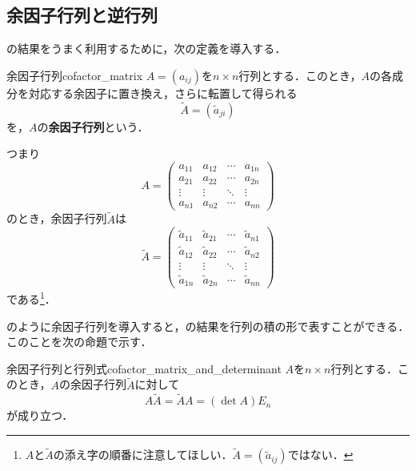 \subsection{余因子行列と逆行列}

の結果をうまく利用するために，次の定義を導入する．

\begin{definition}{余因子行列}{cofactor_matrix}
  $A = (a_{ij})$を$n \times n$行列とする．このとき，$A$の各成分を対応する余因子に置き換え，さらに転置して得られる
  \[
  \tilde{A} = (\tilde{a}_{ji})
  \]
  を，$A$の\textbf{余因子行列}という．

  つまり
  \[
   A = 
   \begin{pmatrix} 
    a_{11} & a_{12} & \cdots & a_{1n} \\
    a_{21} & a_{22} & \cdots & a_{2n} \\
    \vdots & \vdots & \ddots & \vdots \\
    a_{n1} & a_{n2} & \cdots & a_{nn}
   \end{pmatrix}
  \]
  のとき，余因子行列$\tilde{A}$は
  \[
    \tilde{A} =
    \begin{pmatrix}
    \tilde{a}_{11} & \tilde{a}_{21} & \cdots & \tilde{a}_{n1} \\
    \tilde{a}_{12} & \tilde{a}_{22} & \cdots & \tilde{a}_{n2} \\
    \vdots & \vdots & \ddots & \vdots \\
    \tilde{a}_{1n} & \tilde{a}_{2n} & \cdots & \tilde{a}_{nn}
    \end{pmatrix}
  \]
  である\footnote{$A$と$\tilde{A}$の添え字の順番に注意してほしい．$\tilde{A}=(\tilde{a}_{ij})$ではない．}．
\end{definition}

のように余因子行列を導入すると，の結果を行列の積の形で表すことができる．
このことを次の命題で示す．

\begin{prop}{余因子行列と行列式}{cofactor_matrix_and_determinant}
  $A$を$n \times n$行列とする．このとき，$A$の余因子行列$\tilde{A}$に対して
  \[
  A \tilde{A} = \tilde{A} A = (\det A) E_n
  \]
  が成り立つ．
\end{prop}

